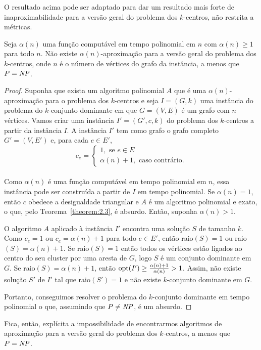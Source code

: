 O resultado acima pode ser adaptado para dar um resultado mais forte de inaproximabilidade para a versão geral do problema dos $k$-centros, não restrita a métricas.
\begin{theorem}
    \label{theorem:2.4}
    Seja $\alpha(n)$ uma função computável em tempo polinomial em $n$ com $\alpha(n)\geq 1$ para todo $n$. Não existe $\alpha(n)$-aproximação para a versão geral do problema dos $k$-centros, onde $n$ é o número de vértices do grafo da instância, a menos que $P=\mathit{NP}$.
\end{theorem}

\begin{proof}
    Suponha que exista um algoritmo polinomial $A$ que é uma $\alpha(n)$-aproximação para o problema dos $k$-centros e seja $I = (G,k)$ uma instância do problema do $k$-conjunto dominante em que $G = (V,E)$ é um grafo com $n$ vértices. Vamos criar uma instância $I' = (G',c,k)$ do problema dos $k$-centros a partir da instância $I$. A instância $I'$ tem como grafo o grafo completo $G' = (V,E')$ e, para cada $e \in E'$,
    \[c_e = \begin{cases}
            1, \text{ se } e \in E \\
            \alpha(n)+1, \text{ caso contrário.} 
            \end{cases}\]\\
    Como $\alpha(n)$ é uma função computável em tempo polinomial em $n$, essa instância pode ser construída a partir de $I$ em tempo polinomial.
    Se $\alpha(n)=1$, então $c$ obedece a desigualdade triangular e $A$ é um algoritmo polinomial e exato, o que, pelo Teorema~\ref{theorem:2.3}, é absurdo. Então, suponha $\alpha(n)>1$.

    O algoritmo $A$ aplicado à instância $I'$ encontra uma solução $S$ de tamanho $k$. Como $c_e = 1$ ou $c_e = \alpha(n)+1$ para todo $e \in E'$, então raio$(S)=1$ ou raio$(S)=\alpha(n)+1$.
    Se raio$(S)=1$ então todos os vértices estão ligados ao centro do seu cluster por uma aresta de $G$, logo $S$ é um conjunto dominante em $G$.
    Se raio$(S) = \alpha(n) + 1$, então $\mathrm{opt}(I') \geq \frac{\alpha(n)+1}{\alpha(n)}>1$. Assim, não existe solução $S'$ de $I'$ tal que raio$(S')=1$ e não existe $k$-conjunto dominante em $G$.

    Portanto, conseguimos resolver o problema do $k$-conjunto dominante em tempo polinomial o que, assumindo que $P \neq \mathit{NP}$, é um absurdo.
\end{proof}
    Fica, então, explícita a impossibilidade de encontrarmos algoritmos de aproximação para a versão geral do problema dos $k$-centros, a menos que $P = \mathit{NP}$.

